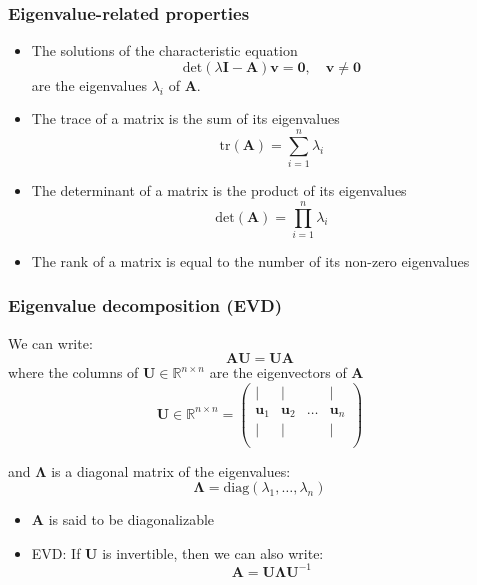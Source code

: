 \documentclass[smaller]{beamer}
\newcommand{\?}{\stackrel{?}{=}}
\newcommand{\la}{\lambda}
\newcommand{\mb}{\mathbb}
\begin{document}
\begin{frame}
  \frametitle{Eigenvalue-related properties}
  \pause
  \begin{itemize}
  \item The solutions of the characteristic equation\pause
    \begin{equation}
      \text{det}(\la\bm I - \bm A)\bm v = \bm 0,\quad \bm v\ne \bm 0
    \end{equation}
    are the eigenvalues $\la_i$ of $\bm A$.
    \pause
  \item The trace of a matrix is the sum of its eigenvalues \pause
  \begin{equation}
  	\text{tr}(\bm A) = \sum_{i=1}^n \la_i
  \end{equation}
\pause

\item The determinant of a matrix is the product of its eigenvalues \pause
\begin{equation}
	\text{det}(\bm A) = \prod_{i=1}^n \la_i
\end{equation}
\pause
\item The rank of a matrix is equal to the number of its non-zero eigenvalues
  \end{itemize}

\end{frame}

\begin{frame}
  \frametitle{Eigenvalue decomposition (EVD)}
  \pause

  We can write: \pause
  \begin{equation}
    \bm A\bm U = \bm U \bm A
  \end{equation}
\pause
where the columns of $\bm U \in \mb{R}^{n\times n}$ are the
eigenvectors of $\bm A$ \pause
\begin{equation}
  \bm U \in \mb{R}^{n\times n} =
  \begin{pmatrix}
    \mid & \mid &  & \mid \\
    \bm u_1 &\bm u_2 & \ldots & \bm u_n \\
    \mid & \mid &  & \mid \\
  \end{pmatrix}
\end{equation}

\pause
and $\bm\Lambda$ is a diagonal matrix of the
eigenvalues:
\pause
\begin{equation}
  \bm\Lambda = \text{diag}(\la_1,\ldots, \la_n)
\end{equation}
\pause
\begin{itemize}
\item $\bm A$ is said to be diagonalizable \pause

\item EVD: If $\bm U$ is invertible, then we can also write: \pause
  \begin{equation}
    \bm A = \bm U\bm\Lambda\bm U^{-1}
  \end{equation}
\end{itemize}
\end{frame}
\end{document}
